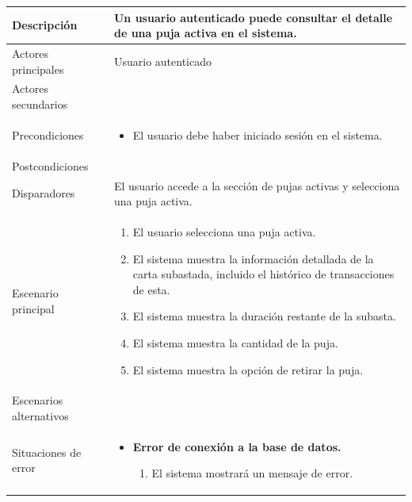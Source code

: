 \begin{longtable}{
    >{\columncolor{lightgreen!20}}p{4cm}
    p{12cm}
    }
    \midrule
    Descripción & Un usuario autenticado puede consultar el detalle de una puja activa en el sistema. \\
    \midrule
    Actores principales & Usuario autenticado \\
    \midrule
    Actores secundarios &  \\
    \midrule
    Precondiciones & \begin{itemize}[nosep,leftmargin=*]
        \item El usuario debe haber iniciado sesión en el sistema.
    \end{itemize} \\
    \midrule
    Postcondiciones &  \\
    \midrule
    Disparadores & El usuario accede a la sección de pujas activas y selecciona una puja activa. \\
    \midrule
    Escenario principal & \begin{enumerate}[nosep,leftmargin=*]
        \item El usuario selecciona una puja activa.
        \item El sistema muestra la información detallada de la carta subastada, incluido el histórico de transacciones de esta.
        \item El sistema muestra la duración restante de la subasta.
        \item El sistema muestra la cantidad de la puja.
        \item El sistema muestra la opción de retirar la puja.
    \end{enumerate} \\
    \midrule
    Escenarios alternativos &  \\
    \midrule
    Situaciones de error & 
    \begin{itemize}[nosep,leftmargin=*]
        \item \textbf{Error de conexión a la base de datos.}
        \begin{enumerate}[nosep,leftmargin=*]
            \item El sistema mostrará un mensaje de error.
        \end{enumerate}
    \end{itemize} \\
\end{longtable}


